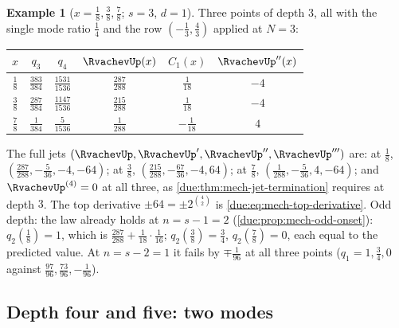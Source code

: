 \documentclass[11pt,oneside]{article}
\theoremstyle{plain}
\theoremstyle{definition}
\newtheorem{example}[theorem]{Example}
\theoremstyle{remark}
\newcommand{\upn}[1]{\RvachevUp_{#1}}
\newcommand{\Cr}[2]{C_{#1}\!\left(#2\right)}                %
\newcommand{\qn}[1]{q_{#1}}                                 %
\begin{document}
\begin{example}[$x=\tfrac18,\tfrac38,\tfrac78$; $s=3$, $d=1$]
\label{due:ex:exr-eighth}
Three points of depth $3$, all with the single mode ratio $\tfrac14$ and
the row $(-\tfrac13,\tfrac43)$ applied at $N=3$:
\begin{center}
\begin{tabular}{@{}cccccc@{}}
\toprule
$x$ & $\qn{3}$ & $\qn{4}$ & $\RvachevUp(x)$ & $\Cr{1}{x}$ & $\RvachevUp''(x)$\\
\midrule
$\tfrac18$ & $\tfrac{383}{384}$ & $\tfrac{1531}{1536}$ & $\tfrac{287}{288}$ & $\tfrac1{18}$ & $-4$\\[0.2em]
$\tfrac38$ & $\tfrac{287}{384}$ & $\tfrac{1147}{1536}$ & $\tfrac{215}{288}$ & $\tfrac1{18}$ & $-4$\\[0.2em]
$\tfrac78$ & $\tfrac1{384}$ & $\tfrac5{1536}$ & $\tfrac1{288}$ & $-\tfrac1{18}$ & $4$\\
\bottomrule
\end{tabular}
\end{center}
The full jets $(\RvachevUp,\RvachevUp',\RvachevUp'',\RvachevUp''')$ are: at
$\tfrac18$, $(\tfrac{287}{288},-\tfrac5{36},-4,-64)$; at $\tfrac38$,
$(\tfrac{215}{288},-\tfrac{67}{36},-4,64)$; at $\tfrac78$,
$(\tfrac1{288},-\tfrac5{36},4,-64)$; and $\RvachevUp^{(4)}=0$ at all
three, as \cref{due:thm:mech-jet-termination} requires at depth $3$.  The
top derivative $\pm64=\pm2^{\binom42}$ is \cref{due:eq:mech-top-derivative}.
Odd depth: the law already holds at $n=s-1=2$
(\cref{due:prop:mech-odd-onset}): $\qn{2}(\tfrac18)=1$, which is
$\tfrac{287}{288}+\tfrac1{18}\cdot\tfrac1{16}$;
$\qn{2}(\tfrac38)=\tfrac34$, $\qn{2}(\tfrac78)=0$, each equal to the
predicted value.  At $n=s-2=1$ it fails by $\mp\tfrac1{96}$ at all three
points ($\qn{1}=1,\tfrac34,0$ against $\tfrac{97}{96},\tfrac{73}{96},
-\tfrac1{96}$).
\end{example}

\subsection{Depth four and five: two modes}
\label{due:sec:exr-two-modes}
\end{document}
